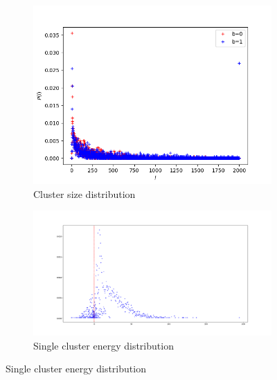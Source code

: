 \documentclass{article}
\begin{document}
	
	\begin{figure}[h]
		\centering
		\begin{subfigure}[b]{0.4\textwidth}
			\includegraphics[width=\textwidth]{Spin glass cluster size dist 3.png}
			\caption{Cluster size distribution}
			\label{fig:img1}
		\end{subfigure}
		\hfill
		\begin{subfigure}[b]{0.5\textwidth}
			\includegraphics[width=\textwidth]{Energy distribution for spin glass 2.png}
			\caption{Single cluster energy distribution}
			\label{fig:img2}
		\end{subfigure}
	\end{figure}
	
\end{document}
